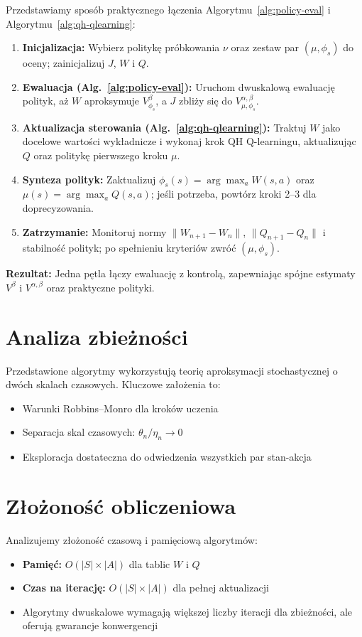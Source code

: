 Przedstawiamy sposób praktycznego łączenia Algorytmu~\ref{alg:policy-eval} i Algorytmu~\ref{alg:qh-qlearning}:

\begin{enumerate}
\item \textbf{Inicjalizacja:} Wybierz politykę próbkowania $\nu$ oraz zestaw par $(\mu, \phi_s)$ do oceny; zainicjalizuj $J$, $W$ i $Q$.
\item \textbf{Ewaluacja (Alg.~\ref{alg:policy-eval}):} Uruchom dwuskalową ewaluację polityk, aż $W$ aproksymuje $V^{\beta}_{\phi_s}$, a $J$ zbliży się do $V^{\alpha,\beta}_{\mu,\phi_s}$.
\item \textbf{Aktualizacja sterowania (Alg.~\ref{alg:qh-qlearning}):} Traktuj $W$ jako docelowe wartości wykładnicze i wykonaj krok QH Q-learningu, aktualizując $Q$ oraz politykę pierwszego kroku $\mu$.
\item \textbf{Synteza polityk:} Zaktualizuj $\phi_s(s) = \arg\max_a W(s,a)$ oraz $\mu(s) = \arg\max_a Q(s,a)$; jeśli potrzeba, powtórz kroki 2--3 dla doprecyzowania.
\item \textbf{Zatrzymanie:} Monitoruj normy $\|W_{n+1}-W_n\|$, $\|Q_{n+1}-Q_n\|$ i stabilność polityk; po spełnieniu kryteriów zwróć $(\mu, \phi_s)$.
\end{enumerate}

\textbf{Rezultat:} Jedna pętla łączy ewaluację z kontrolą, zapewniając spójne estymaty $V^{\beta}$ i $V^{\alpha,\beta}$ oraz praktyczne polityki.

\section{Analiza zbieżności}

Przedstawione algorytmy wykorzystują teorię aproksymacji stochastycznej o dwóch skalach czasowych. Kluczowe założenia to:
\begin{itemize}
\item Warunki Robbins--Monro dla kroków uczenia
\item Separacja skal czasowych: $\theta_n / \eta_n \to 0$
\item Eksploracja dostateczna do odwiedzenia wszystkich par stan-akcja
\end{itemize}

\section{Złożoność obliczeniowa}

Analizujemy złożoność czasową i pamięciową algorytmów:
\begin{itemize}
\item \textbf{Pamięć:} $O(|S| \times |A|)$ dla tablic $W$ i $Q$
\item \textbf{Czas na iterację:} $O(|S| \times |A|)$ dla pełnej aktualizacji
\item Algorytmy dwuskalowe wymagają większej liczby iteracji dla zbieżności, ale oferują gwarancje konwergencji
\end{itemize}